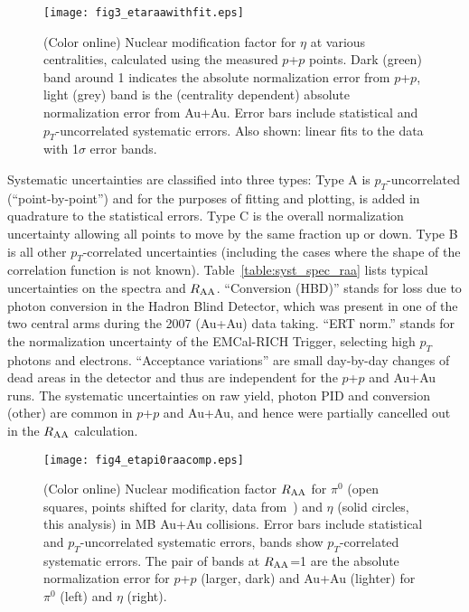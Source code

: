 \documentclass[aps,prc,superscriptaddress,showpacs,nofootinbib,floatfix,twocolumn]{revtex4}
\def\pt{$p_T$}
\def\pts{$p_T$ }
\def\raa{$R_{\rm AA}$}
\def\raas{$R_{\rm AA}$ }
\def\pp{$p$+$p$ }
\def\pizs{$\pi^{0}$ }
\def\hs{$\eta$ }
\begin{document}
\begin{figure}[tbh]
\texttt{[image: fig3\_etaraawithfit.eps]}
\caption{\label{fig:fig3_etaraawithfit} (Color online) 
Nuclear modification factor for \hs at various centralities,
calculated using the measured \pp points.  Dark
(green) band around 1 indicates the absolute normalization error from
$p$+$p$, light (grey) band is the (centrality dependent) absolute
normalization error from Au+Au.  Error bars include statistical and
\pt-uncorrelated systematic errors.  Also shown: linear fits to the
data with 1$\sigma$ error bands.
}
\end{figure}


Systematic uncertainties are classified into three types: Type A is 
$p_T$-uncorrelated (``point-by-point'') and for the purposes of 
fitting and plotting, is added in quadrature to the statistical 
errors.  Type C is the overall normalization uncertainty allowing all 
points to move by the same fraction up or down.  Type B is all other 
\pt-correlated uncertainties (including the cases where the shape of 
the correlation function is not known).  
Table~\ref{table:syst_spec_raa} lists typical uncertainties on the 
spectra and \raa.  ``Conversion (HBD)'' stands for loss due to photon 
conversion in the Hadron Blind Detector, which was present in one of 
the two central arms during the 2007 (Au+Au) data taking.  ``ERT 
norm.'' stands for the normalization uncertainty of the EMCal-RICH 
Trigger, selecting high \pts photons and electrons.  ``Acceptance 
variations'' are small day-by-day changes of dead areas in the 
detector and thus are independent for the \pp and Au+Au runs.  The 
systematic uncertainties on raw yield, photon PID and conversion 
(other) are common in \pp and Au+Au, and hence were partially 
cancelled out in the $R_{\rm AA}$ calculation.

\begin{figure}[tbh]
\texttt{[image: fig4\_etapi0raacomp.eps]}
\caption{\label{fig:fig4_etapi0raacomp} (Color online) 
Nuclear modification factor \raas for \pizs 
(open squares, points shifted for clarity, data from~\cite{ppg080}) 
and \hs (solid circles, this analysis) in MB Au+Au collisions.
Error bars include statistical and \pt-uncorrelated systematic errors,
bands show \pt-correlated systematic errors.  The pair of bands at
\raa=1 are the absolute normalization error for \pp (larger, dark) and
Au+Au (lighter) for \pizs (left) and \hs (right).
}
\end{figure}
\end{document}
